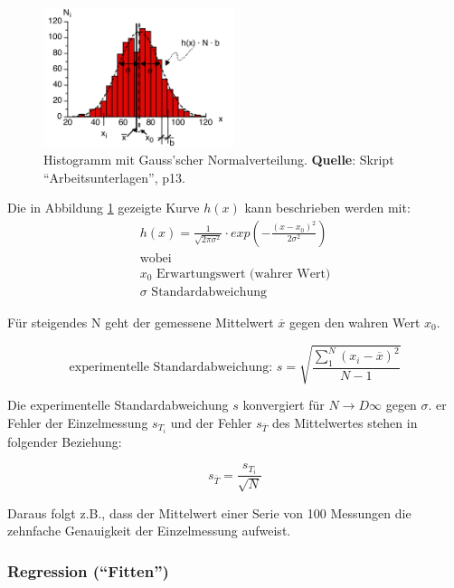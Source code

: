 \begin{figure}[h!]
    \centering
    \includegraphics[width=0.5\textwidth]{images/gauss.png}
    \caption{Histogramm mit Gauss'scher Normalverteilung. \textbf{Quelle}: Skript ``Arbeitsunterlagen'', p13.}
    \label{fig:gauss}
\end{figure}

Die in Abbildung \ref{fig:gauss} gezeigte Kurve $h(x)$ kann beschrieben werden mit:
\begin{gather*}
    h(x) = \frac{1}{\sqrt{2\pi\sigma^2}} \cdot exp\left(- \frac{(x-x_0)^2}{2\sigma^2}\right) \\
    \text{wobei} \\
    x_0 \text{ Erwartungswert (wahrer Wert)} \\
    \sigma \text{ Standardabweichung}
\end{gather*}

F\"ur steigendes N geht der gemessene Mittelwert $\overline{x}$ gegen den wahren Wert $x_0$.

\begin{equation*}
    \text{experimentelle Standardabweichung: } s = \sqrt{\frac{\sum_1^N{(x_i-\overline{x})^2}}{N-1}}
\end{equation*}

Die  experimentelle Standardabweichung  $s$ konvergiert  f\"ur $N  \rightarrow
D\infty $ gegen $\sigma$. er Fehler der Einzelmessung $s_{T_i}$ und der Fehler
$s_{\overline{T}}$ des Mittelwertes stehen in folgender Beziehung:

\begin{equation*}
    s_{\overline{T}} = \frac{s_{T_i}}{\sqrt{N}}
\end{equation*}

Daraus  folgt z.B.,  dass der  Mittelwert einer  Serie von  100 Messungen  die
zehnfache Genauigkeit der Einzelmessung aufweist.


\subsubsection{Regression (``Fitten'')}

